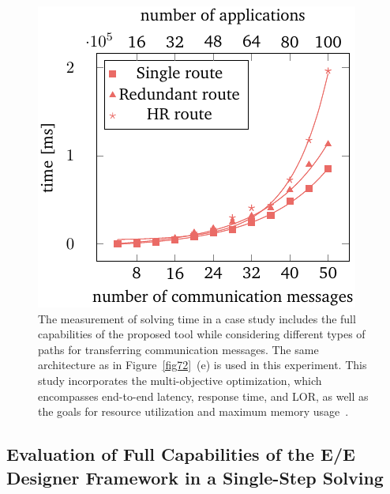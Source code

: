            \begin{figure}[ht]
    	\centering
    	\includegraphics[width=0.5\columnwidth]{figures/full-framework.pdf}
   	\caption{The measurement of solving time in a case study includes the full capabilities of the proposed tool while considering different types of paths for transferring communication messages. The same architecture as in Figure~\ref{fig72}~(e) is used in this experiment. This study incorporates the multi-objective optimization, which encompasses end-to-end latency, response time, and LOR, as well as the goals for resource utilization and maximum memory usage~\cite{askaripoor2023designer}.}       
   	
    	\label{fig73}
        \end{figure} 
    
    \subsection{Evaluation of Full Capabilities of the E/E Designer Framework in a Single-Step Solving}
         
    
